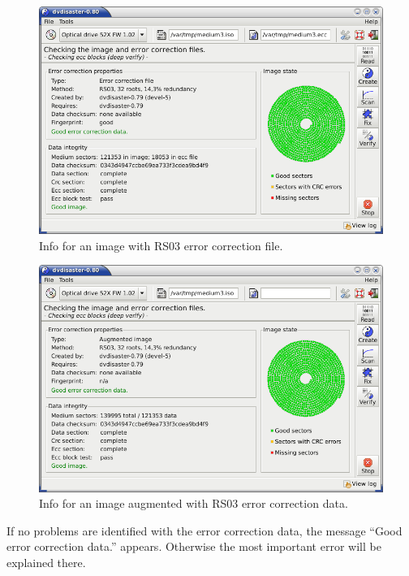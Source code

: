 \newpage
\begin{figure}[h]
\vspace*{-5mm}
\centerline{\includegraphics[width=\textwidth]{screenshots/info-okay-rs03-file.png}}
\caption{Info for an image with RS03 error correction file.}
\label{howto-info-good-rs03-file}
\end{figure}
\begin{figure}[h]
\centerline{\includegraphics[width=\textwidth]{screenshots/info-okay-rs03-augmented.png}}
\caption{Info for an image augmented with RS03 error correction data.}
\vspace*{-50mm}
\label{howto-info-good-rs03-augmented}
\end{figure}
\newpage

If no problems are identified with the error correction data,
the message ``\textcolor{dkgreen}{Good error correction data.}'' appears.
Otherwise the most important error will be explained there. 

